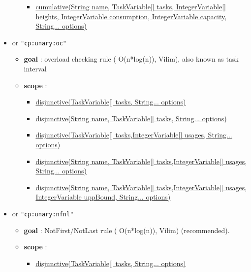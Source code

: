 \begin{itemize}
\begin{itemize}
\begin{itemize}
						\item \hyperlink{cumulative:cumulativeconstraint}{cumulative(String name, TaskVariable[] tasks, IntegerVariable[] heights, IntegerVariable consumption, IntegerVariable capacity, String... options)}
					\end{itemize}
		\end{itemize}		
		\item \label{cdisjunctiveoc:cdisjunctiveocoptions}\hypertarget{cdisjunctiveoc:cdisjunctiveocoptions}{}		
		 or \texttt{"cp:unary:oc"}
		\begin{itemize}
				\item \textbf{goal} : overload checking rule ( O(n*log(n)), Vilim), also known as task interval
				\item \textbf{scope} : 
					\begin{itemize}
						\item \hyperlink{disjunctive:disjunctiveconstraint}{disjunctive(TaskVariable[] tasks, String... options) }
						\item \hyperlink{disjunctive:disjunctiveconstraint}{disjunctive(String name, TaskVariable[] tasks, String... options)}													\item \hyperlink{disjunctive:disjunctiveconstraint}{disjunctive(TaskVariable[] tasks,IntegerVariable[] usages, String... options)}
						\item \hyperlink{disjunctive:disjunctiveconstraint}{disjunctive(String name, TaskVariable[] tasks,IntegerVariable[] usages, String... options)}							
						\item \hyperlink{disjunctive:disjunctiveconstraint}{disjunctive(String name, TaskVariable[] tasks,IntegerVariable[] usages, IntegerVariable uppBound, String... options)}
					\end{itemize}
		\end{itemize}
		\item \label{cdisjunctivenfnl:cdisjunctivenfnloptions}\hypertarget{cdisjunctivenfnl:cdisjunctivenfnloptions}{}		
		 or \texttt{"cp:unary:nfnl"}
		\begin{itemize}
				\item \textbf{goal} : NotFirst/NotLast rule ( O(n*log(n)), Vilim) (recommended).
				\item \textbf{scope} : 
					\begin{itemize}
						\item \hyperlink{disjunctive:disjunctiveconstraint}{disjunctive(TaskVariable[] tasks, String... options) }

\end{itemize}
\end{itemize}
\end{itemize}
